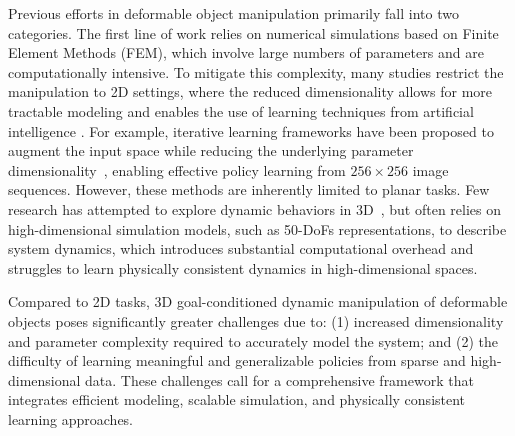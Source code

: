 \documentclass{article}
\begin{document}

Previous efforts in deformable object manipulation primarily fall into two categories. The first line of work relies on numerical simulations based on Finite Element Methods (FEM), which involve large numbers of parameters and are computationally intensive. To mitigate this complexity, many studies restrict the manipulation to 2D settings, where the reduced dimensionality allows for more tractable modeling and enables the use of learning techniques from artificial intelligence \cite{li2015folding, jangir2020dynamic,hietala2022learning}. For example, iterative learning frameworks have been proposed to augment the input space while reducing the underlying parameter dimensionality~\cite{chi2024iterative}, enabling effective policy learning from $256 \times 256$ image sequences. However, these methods are inherently limited to planar tasks.
Few research has attempted to explore dynamic behaviors in 3D~\cite{nah2021manipulating}, but often relies on high-dimensional simulation models, such as 50-DoFs representations, to describe system dynamics, which introduces substantial computational overhead and struggles to learn physically consistent dynamics in high-dimensional spaces.

Compared to 2D tasks, 3D goal-conditioned dynamic manipulation of deformable objects poses significantly greater challenges due to: (1) increased dimensionality and parameter complexity required to accurately model the system; and (2) the difficulty of learning meaningful and generalizable policies from sparse and high-dimensional data. These challenges call for a comprehensive framework that integrates efficient modeling, scalable simulation, and physically consistent learning approaches.
\end{document}
